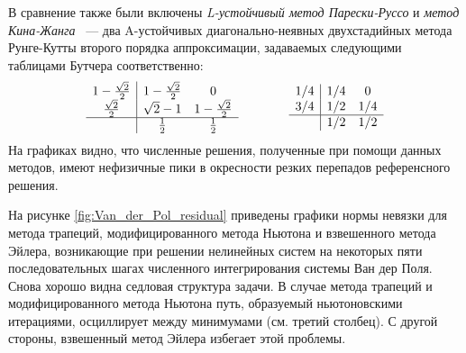 В сравнение также были включены \emph{L-устойчивый метод Парески-Руссо} \cite{pareschi2005imex} и \emph{метод Кина-Жанга} \cite{qin1992symplecticdirk}~---
два A-устойчивых диагонально-неявных двухстадийных метода Рунге-Кутты второго порядка аппроксимации,
задаваемых следующими таблицами Бутчера соответственно:
%
\begin{equation}
    \label{eq:Pareschi-Russo_and_Qin-Zhang}
    \begin{array}{c|cc}
        1 - \frac{\sqrt{2}}{2} & 1 - \frac{\sqrt{2}}{2} & 0 \\
        \frac{\sqrt{2}}{2}    & \sqrt{2} - 1          & 1 - \frac{\sqrt{2}}{2} \\
        \hline
         & \frac{1}{2} & \frac{1}{2}
    \end{array}
    \qquad \qquad
    \begin{array}{c|cc}
        1/4 & 1/4 & 0 \\
        3/4 & 1/2 & 1/4 \\
        \hline
         & 1/2 & 1/2
    \end{array}
\end{equation}
%
На графиках видно, что численные решения, полученные при помощи данных методов,
имеют нефизичные пики в окресности резких перепадов референсного решения.

На рисунке \ref{fig:Van_der_Pol_residual} приведены графики нормы невязки для метода трапеций,
модифицированного метода Ньютона и взвешенного метода Эйлера,
возникающие при решении нелинейных систем на некоторых пяти последовательных шагах
численного интегрирования системы Ван дер Поля.
Снова хорошо видна седловая структура задачи.
В случае метода трапеций и модифицированного метода Ньютона путь,
образуемый ньютоновскими итерациями, осциллирует между минимумами (см. третий столбец).
С другой стороны, взвешенный метод Эйлера избегает этой проблемы.

